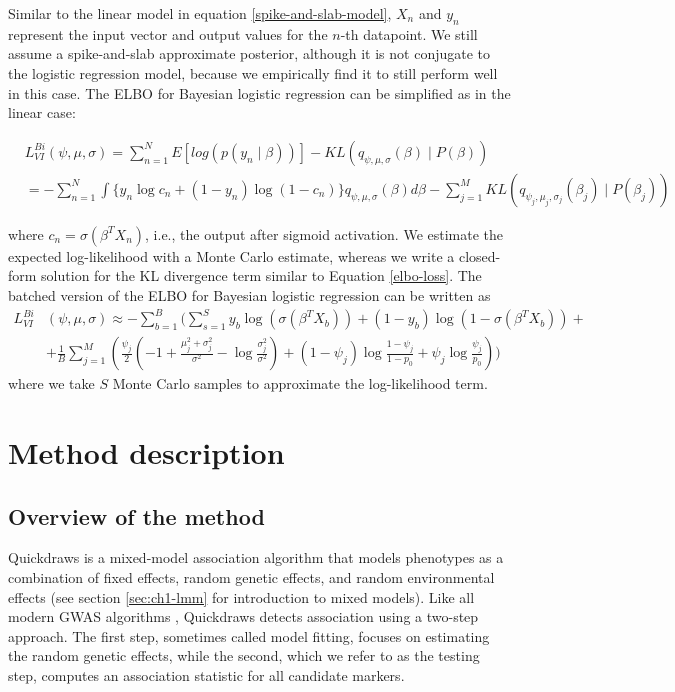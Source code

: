 Similar to the linear model in equation \ref{spike-and-slab-model}, $X_n$ and $y_n$ represent the input vector and output values for the $n$-th datapoint.
%
We still assume a spike-and-slab approximate posterior, although it is not conjugate to the logistic regression model, because we empirically find it to still perform well in this case.
%
The ELBO for Bayesian logistic regression can be simplified as in the linear case:
\begin{small}
\begin{align}
 &L^{Bi}_{VI}(\psi, \mu, \sigma) = \sum\limits^{N}_{n=1} E[log(p(y_{n} \mid \beta))] - KL(q_{\psi, \mu, \sigma}(\beta) \mid P(\beta)) \nonumber \\
 &= - \sum\limits^{N}_{n=1} \int \{y_n \log c_n + (1-y_n)\log(1-c_n)\} q_{\psi, \mu, \sigma}(\beta) d\beta - \sum\limits^{M}_{j=1} KL(q_{\psi_j, \mu_j, \sigma_j}(\beta_j) \mid P(\beta_j))
\label{spike-and-slab-2}
\end{align}
\end{small}
where $c_n = \sigma(\beta^T X_n)$, i.e., the output after sigmoid activation.
%
We estimate the expected log-likelihood with a Monte Carlo estimate, whereas we write a closed-form solution for the KL divergence term similar to Equation \ref{elbo-loss}.
%
The batched version of the ELBO for Bayesian logistic regression can be written as
\begin{align}
    L^{Bi}_{VI}&(\psi, \mu, \sigma) \approx - \sum\limits^{B}_{b=1} \Bigg( \sum\limits^{S}_{s=1} y_b \log(\sigma(\beta^T X_b)) + (1-y_b)\log(1-\sigma(\beta^T X_b)) \nonumber +\\
    &+ \frac{1}{B}\sum\limits^{M}_{j=1} \left(  \frac{\psi_j}{2}\left(-1 + \frac{\mu_j^2 + \sigma_j^2}{\sigma^2} - \log \frac{\sigma_j^2}{\sigma^2} \right) + (1-\psi_j)\log\frac{1 - \psi_j}{1 - p_0} + \psi_j\log\frac{\psi_j}{p_0} \right) \Bigg)
\label{elbo-loss2}
\end{align}
where we take $S$ Monte Carlo samples to approximate the log-likelihood term.


\section{Method description}
\label{sec:ch4-method}
\subsection{Overview of the method}
Quickdraws is a mixed-model association algorithm that models phenotypes as a combination of fixed effects, random genetic effects, and random environmental effects (see section \ref{sec:ch1-lmm} for introduction to mixed models).
%
Like all modern GWAS algorithms \cite{loh2015efficient,loh2018mixed,zhou2018efficiently,jiang2019resource,jiang2021generalized,mbatchou2021computationally}, Quickdraws detects association using a two-step approach.
%
The first step, sometimes called model fitting, focuses on estimating the random genetic effects, while the second, which we refer to as the testing step, computes an association statistic for all candidate markers.


